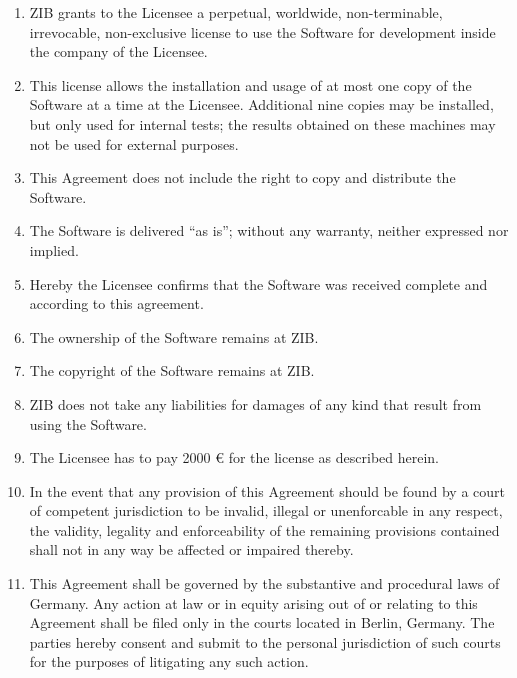 \documentclass[12pt,a4paper]{article}
\begin{document}
\begin{enumerate}
\item ZIB grants to the Licensee a perpetual, worldwide, non-terminable,
  irrevocable, non-exclusive license to use the Software for development
  inside the company of the Licensee.

\item This license allows the installation and usage of at most one copy of
  the Software at a time at the Licensee. Additional nine copies may be
  installed, but only used for internal tests; the results obtained on
  these machines may not be used for external purposes.

\item This Agreement does not include the right to copy and distribute the
  Software.


\item The Software is delivered ``as is'';
   without any warranty, neither expressed nor implied.

\item Hereby the Licensee confirms that the Software was received
  complete and according to this agreement.

\item The ownership of the Software remains at ZIB.

\item The copyright of the Software remains at ZIB.

\item ZIB does not take any liabilities for damages of any kind that
  result from using the Software.

\item The Licensee has to pay 2000 \euro{} for the license as described herein.


\item In the event that any provision of this Agreement should be
  found by a court of competent jurisdiction to be invalid, illegal or
  unenforcable in any respect, the validity, legality and
  enforceability of the remaining provisions contained shall not in
  any way be affected or impaired thereby.

\item This Agreement shall be governed by the substantive and
  procedural laws of Germany. Any action at law or in equity arising
  out of or relating to this Agreement shall be filed only in the
  courts located in Berlin, Germany. The parties hereby consent and
  submit to the personal jurisdiction of such courts for the purposes
  of litigating any such action.

\end{enumerate}
\end{document}
